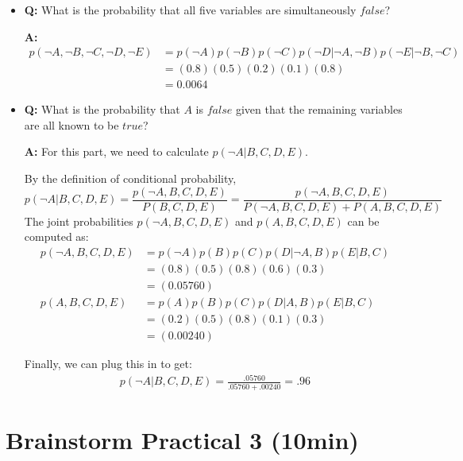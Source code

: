 \documentclass[11pt,letterpaper]{article}
\begin{document}
\begin{itemize}
\item \textbf{Q:} What is the probability that all five variables are simultaneously $false$? 

\begin{solution}
\textbf{A:}  
%
\begin{align*}
p(\neg A, \neg B, \neg C, \neg D, \neg E) &= p(\neg A) p(\neg B) p(\neg C) p(\neg D|\neg A, \neg B) p(\neg E | \neg B, \neg C)\\
&= (0.8)(0.5)(0.2)(0.1)(0.8)\\
&= 0.0064
\end{align*}
\end{solution}


\item \textbf{Q:} What is the probability that $A$ is $false$ given that the remaining variables are all known to be $true$? \\

\begin{solution}
\textbf{A:} For this part, we need to calculate $p(\neg A|B,C,D,E)$. 

By the definition of conditional probability, $$p(\neg A|B,C,D,E) = \frac{p(\neg A,B,C,D,E)}{P(B,C,D,E)} = \frac{p(\neg A,B,C,D,E)}{P(\neg A, B,C,D,E) +P(A, B,C,D,E)  } $$ The joint probabilities $p(\neg A,B,C,D,E)$ and  $p(A,B,C,D,E)$ can be computed as:
%
\begin{align*}
p(\neg A,B,C,D,E) &= p(\neg A)p(B)p(C)p(D|\neg A,B)p(E|B,C)\\
&=(0.8)(0.5)(0.8)(0.6)(0.3) \\
&=(0.05760) \\
p(A,B,C,D,E)&= p(A)p(B)p(C)p(D| A,B)p(E|B,C)\\
&=(0.2)(0.5)(0.8)(0.1)(0.3)\\
&=(0.00240) 
\end{align*}

Finally, we can plug this in to get:
%
\begin{align*}
p(\neg A| B,C,D,E) = \frac{.05760}{.05760 +.00240} = .96
\end{align*}
\end{solution}

\end{itemize}

\section{Brainstorm Practical 3 (10min)}
\end{document}
